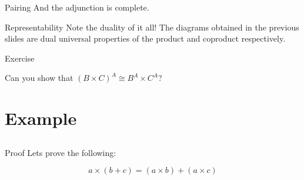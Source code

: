 \documentclass[tikz]{beamer}
\theoremstyle{definition}
\begin{document}
\begin{frame}{Pairing}
    And the adjunction is complete.
\end{frame}

\begin{frame}{Representability}
    Note the duality of it all! The diagrams obtained in the previous slides are dual universal properties of the product and coproduct respectively.
\end{frame}

\begin{frame}{Exercise}

Can you show that $(B \times C)^A \cong B^A \times C^A$?
\end{frame}

\section{Example}
\subsection{}
    
\begin{frame}{Proof}
    Lets prove the following:
    
    \begin{center}
        \begin{equation*}
            a \times (b + c) = (a \times b) + (a \times c)
        \end{equation*}
    \end{center}

\end{frame}
\end{document}
